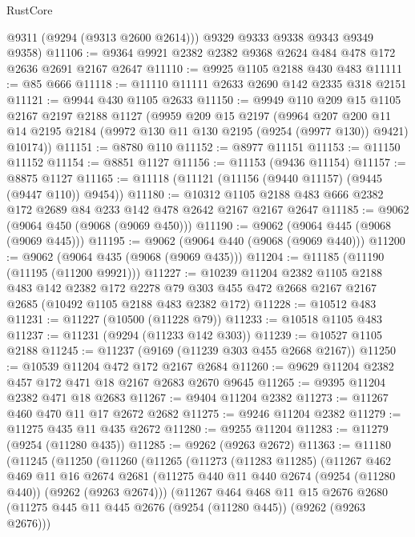 \begin{lexlean}{RustCore}
\begin{coremodule}
        @9311
        (@9294 (@9313 @2600 @2614)))
      @9329
      @9333
      @9338
      @9343
      @9349
      @9358)
@11106 := @9364 @9921 @2382 @2382 @9368 @2624 @484 @478 @172 @2636 @2691 @2167 @2647
@11110 := @9925 @1105 @2188 @430 @483
@11111 := @85 @666
@11118 := @11110 @11111 @2633 @2690 @142 @2335 @318 @2151
@11121 := @9944 @430 @1105 @2633
@11150 := @9949
    @110
    @209
    @15
    @1105
    @2167
    @2197
    @2188
    @1127
    (@9959
      @209
      @15
      @2197
      (@9964
        @207
        @200
        @11
        @14
        @2195
        @2184
        (@9972 @130 @11 @130 @2195 (@9254 (@9977 @130)) @9421)
        @10174))
@11151 := @8780 @110
@11152 := @8977 @11151
@11153 := @11150 @11152
@11154 := @8851 @1127
@11156 := @11153 (@9436 @11154)
@11157 := @8875 @1127
@11165 := @11118 (@11121 (@11156 (@9440 @11157) (@9445 (@9447 @110)) @9454))
@11180 := @10312 @1105 @2188 @483 @666 @2382 @172 @2689 @84 @233 @142 @478 @2642 @2167 @2167 @2647
@11185 := @9062 (@9064 @450 (@9068 (@9069 @450)))
@11190 := @9062 (@9064 @445 (@9068 (@9069 @445)))
@11195 := @9062 (@9064 @440 (@9068 (@9069 @440)))
@11200 := @9062 (@9064 @435 (@9068 (@9069 @435)))
@11204 := @11185 (@11190 (@11195 (@11200 @9921)))
@11227 := @10239
    @11204
    @2382
    @1105
    @2188
    @483
    @142
    @2382
    @172
    @2278
    @79
    @303
    @455
    @472
    @2668
    @2167
    @2167
    @2685
    (@10492 @1105 @2188 @483 @2382 @172)
@11228 := @10512 @483
@11231 := @11227 (@10500 (@11228 @79))
@11233 := @10518 @1105 @483
@11237 := @11231 (@9294 (@11233 @142 @303))
@11239 := @10527 @1105 @2188
@11245 := @11237 (@9169 (@11239 @303 @455 @2668 @2167))
@11250 := @10539 @11204 @472 @172 @2167 @2684
@11260 := @9629 @11204 @2382 @457 @172 @471 @18 @2167 @2683 @2670 @9645
@11265 := @9395 @11204 @2382 @471 @18 @2683
@11267 := @9404 @11204 @2382
@11273 := @11267 @460 @470 @11 @17 @2672 @2682
@11275 := @9246 @11204 @2382
@11279 := @11275 @435 @11 @435 @2672
@11280 := @9255 @11204
@11283 := @11279 (@9254 (@11280 @435))
@11285 := @9262 (@9263 @2672)
@11363 := @11180
    (@11245
      (@11250
        (@11260
          (@11265
            (@11273
              (@11283 @11285)
              (@11267
                @462
                @469
                @11
                @16
                @2674
                @2681
                (@11275 @440 @11 @440 @2674 (@9254 (@11280 @440)) (@9262 (@9263 @2674)))
                (@11267
                  @464
                  @468
                  @11
                  @15
                  @2676
                  @2680
                  (@11275 @445 @11 @445 @2676 (@9254 (@11280 @445)) (@9262 (@9263 @2676)))

\end{coremodule}
\end{lexlean}
